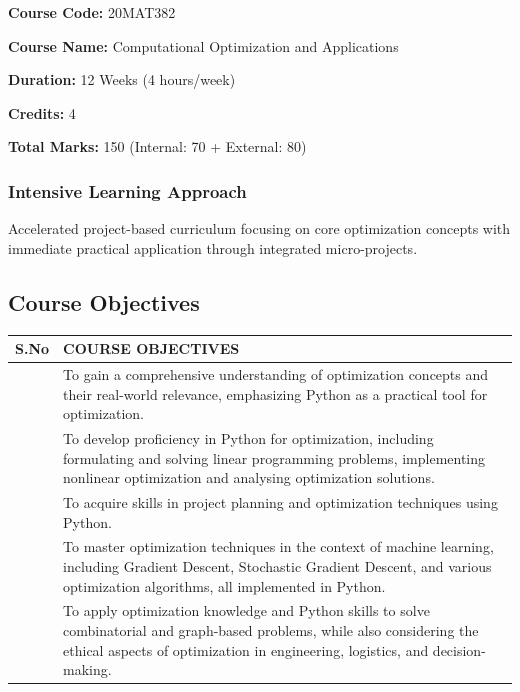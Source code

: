 \documentclass[
  letterpaper,
  DIV=11,
  numbers=noendperiod]{scrreprt}
\begin{document}
\textbf{Course Code:} 20MAT382

\textbf{Course Name:} Computational Optimization and Applications

\textbf{Duration:} 12 Weeks (4 hours/week)

\textbf{Credits:} 4

\textbf{Total Marks:} 150 (Internal: 70 + External: 80)

\subsubsection*{Intensive Learning
Approach}\label{intensive-learning-approach}

Accelerated project-based curriculum focusing on core optimization
concepts with immediate practical application through integrated
micro-projects.

\subsection*{Course Objectives}\label{course-objectives}

\begin{longtable}[]{@{}
  >{\raggedright\arraybackslash}p{}
  >{\raggedright\arraybackslash}p{}@{}}
\toprule\noalign{}
\begin{minipage}[b]{\linewidth}\raggedright
S.No
\end{minipage} & \begin{minipage}[b]{\linewidth}\raggedright
COURSE OBJECTIVES
\end{minipage} \\
\midrule\noalign{}
\endhead
\bottomrule\noalign{}
\endlastfoot
1 & To gain a comprehensive understanding of optimization concepts and
their real-world relevance, emphasizing Python as a practical tool for
optimization. \\
2 & To develop proficiency in Python for optimization, including
formulating and solving linear programming problems, implementing
nonlinear optimization and analysing optimization solutions. \\
3 & To acquire skills in project planning and optimization techniques
using Python. \\
4 & To master optimization techniques in the context of machine
learning, including Gradient Descent, Stochastic Gradient Descent, and
various optimization algorithms, all implemented in Python. \\
5 & To apply optimization knowledge and Python skills to solve
combinatorial and graph-based problems, while also considering the
ethical aspects of optimization in engineering, logistics, and
decision-making. \\
\end{longtable}
\end{document}
